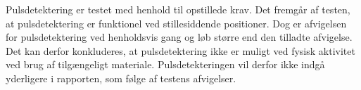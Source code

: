 Pulsdetektering er testet med henhold til opstillede krav. Det fremgår af testen, at pulsdetektering er funktionel ved stillesiddende positioner. Dog er afvigelsen for pulsdetektering ved henholdsvis gang og løb større end den tilladte afvigelse. Det kan derfor konkluderes, at pulsdetektering ikke er muligt ved fysisk aktivitet ved brug af tilgængeligt materiale. Pulsdetekteringen vil derfor ikke indgå yderligere i rapporten, som følge af testens afvigelser.
